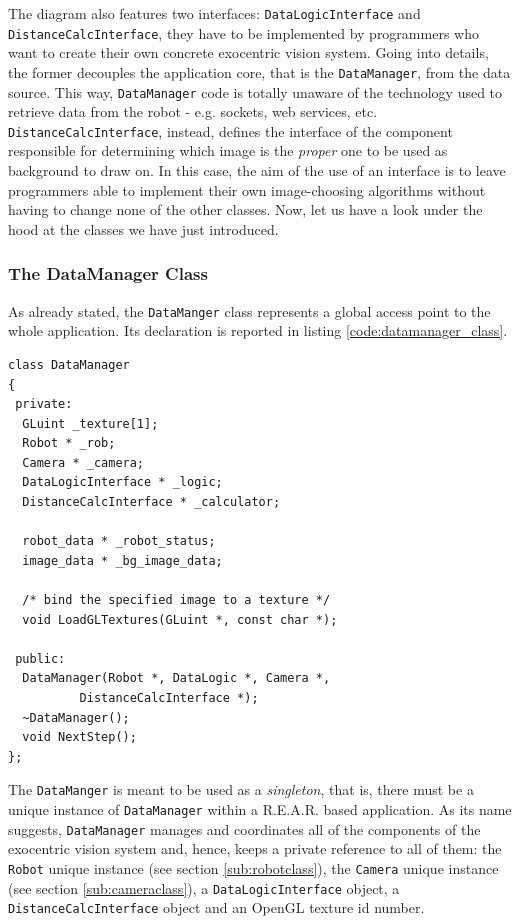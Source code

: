 %
The diagram also features two interfaces: \texttt{DataLogicInterface} and
\texttt{DistanceCalcInterface}, they have to be implemented by 
programmers who want to create their own concrete exocentric 
vision system. 
%
Going into details, the former decouples the application 
core, that is the \texttt{DataManager}, from the data source.
This way, \texttt{DataManager} code is totally unaware of 
the technology used to retrieve data from the robot - e.g. 
sockets, web services, etc.
%
\texttt{DistanceCalcInterface}, instead, defines the interface 
of the component responsible for determining which image is the 
\textit{proper} one to be used as background to draw on. In this 
case, the aim of the use of an interface is to leave programmers 
able to implement their own image-choosing algorithms without 
having to change none of the other classes.
%
Now, let us have a look under the hood at the classes we have just 
introduced.
%
\subsubsection{The DataManager Class}
\label{sub:datamanager}
As already stated, the \texttt{DataManger} class represents a global 
access point to the whole application. Its declaration is reported in
listing \ref{code:datamanager_class}.
%
\begin{lstlisting}[caption={DataManager class declaration}, label={code:datamanager_class}, frame=trBL]
class DataManager
{
 private:
  GLuint _texture[1];
  Robot * _rob;
  Camera * _camera;
  DataLogicInterface * _logic;
  DistanceCalcInterface * _calculator;

  robot_data * _robot_status;
  image_data * _bg_image_data;

  /* bind the specified image to a texture */
  void LoadGLTextures(GLuint *, const char *);

 public:
  DataManager(Robot *, DataLogic *, Camera *, 
	      DistanceCalcInterface *); 
  ~DataManager();
  void NextStep();
};
\end{lstlisting}
%
The \texttt{DataManger} is meant to be used as a \textit{singleton}, 
that is, there must be a unique instance of \texttt{DataManager} 
within a \textsf{R.E.A.R.} based application.
%
As its name suggests, \texttt{DataManager} manages and coordinates 
all of the components of the exocentric vision system and, hence, 
keeps a private reference to all of them: 
the \texttt{Robot} unique instance (see section \ref{sub:robotclass}), the 
\texttt{Camera} unique instance (see section \ref{sub:cameraclass}),
a \texttt{DataLogicInterface} object, a \texttt{DistanceCalcInterface} 
object and an OpenGL texture id number.
%

